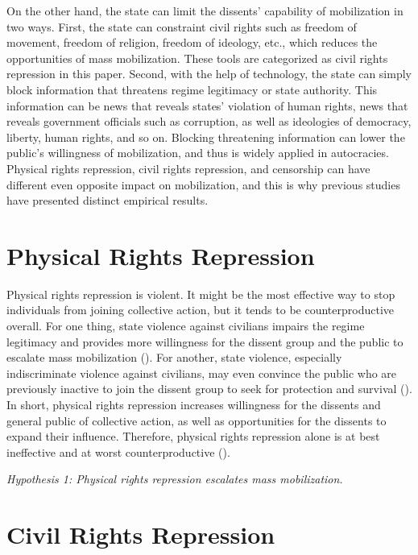 \documentclass[11pt,]{article}
\begin{document}
On the other hand, the state can limit the dissents' capability of
mobilization in two ways. First, the state can constraint civil rights
such as freedom of movement, freedom of religion, freedom of ideology,
etc., which reduces the opportunities of mass mobilization. These tools
are categorized as civil rights repression in this paper. Second, with
the help of technology, the state can simply block information that
threatens regime legitimacy or state authority. This information can be
news that reveals states' violation of human rights, news that reveals
government officials such as corruption, as well as ideologies of
democracy, liberty, human rights, and so on. Blocking threatening
information can lower the public's willingness of mobilization, and thus
is widely applied in autocracies. Physical rights repression, civil
rights repression, and censorship can have different even opposite
impact on mobilization, and this is why previous studies have presented
distinct empirical results.

\section{Physical Rights Repression}

Physical rights repression is violent. It might be the most effective
way to stop individuals from joining collective action, but it tends to
be counterproductive overall. For one thing, state violence against
civilians impairs the regime legitimacy and provides more willingness
for the dissent group and the public to escalate mass mobilization
(\citet{Goodwin2001}). For another, state violence, especially
indiscriminate violence against civilians, may even convince the public
who are previously inactive to join the dissent group to seek for
protection and survival (\citet{Kalyvas2007}). In short, physical rights
repression increases willingness for the dissents and general public of
collective action, as well as opportunities for the dissents to expand
their influence. Therefore, physical rights repression alone is at best
ineffective and at worst counterproductive (\citet{Kalyvas2006}).

\textit{Hypothesis 1: Physical rights repression escalates mass mobilization.}

\section{Civil Rights Repression}
\end{document}
